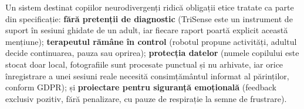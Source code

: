 Un sistem destinat copiilor neurodivergenți ridică obligații etice tratate ca parte din specificație: \textbf{fără pretenții de diagnostic} (TriSense este un instrument de suport în sesiuni ghidate de un adult, iar fiecare raport poartă explicit această mențiune); \textbf{terapeutul rămâne în control} (robotul propune activități, adultul decide continuarea, pauza sau oprirea); \textbf{protecția datelor} (numele copilului este stocat doar local, fotografiile sunt procesate punctual și nu arhivate, iar orice înregistrare a unei sesiuni reale necesită consimțământul informat al părinților, conform GDPR); și \textbf{proiectare pentru siguranță emoțională} (feedback exclusiv pozitiv, fără penalizare, cu pauze de respirație la semne de frustrare).
